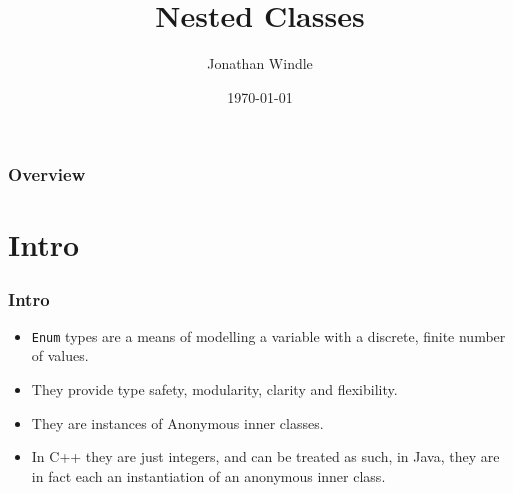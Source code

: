 \documentclass{beamer}
\title[Nested Classes]{Nested Classes} %
\author{Jonathan Windle} %
\institute[UEA] %
{
University of East Anglia \\ %
\medskip
\textit{J.Windle@uea.ac.uk} %
}
\date{\today} %
\begin{document}
\begin{frame}
\titlepage %
\end{frame}

\begin{frame}[allowframebreaks]
\frametitle{Overview} %
\tableofcontents %
\end{frame}
\section{Intro}
\begin{frame}
\frametitle{Intro}
\begin{itemize}
\item \texttt{Enum} types are a means of modelling a variable with a discrete, finite number of values.
\item They provide type safety, modularity, clarity and flexibility.
\item They are instances of {\color{red} Anonymous inner classes}.
\item In C++ they are just integers, and can be treated as such, in Java, they are in fact each an instantiation of an anonymous inner class.
\end{itemize}
\end{frame}
\end{document}
